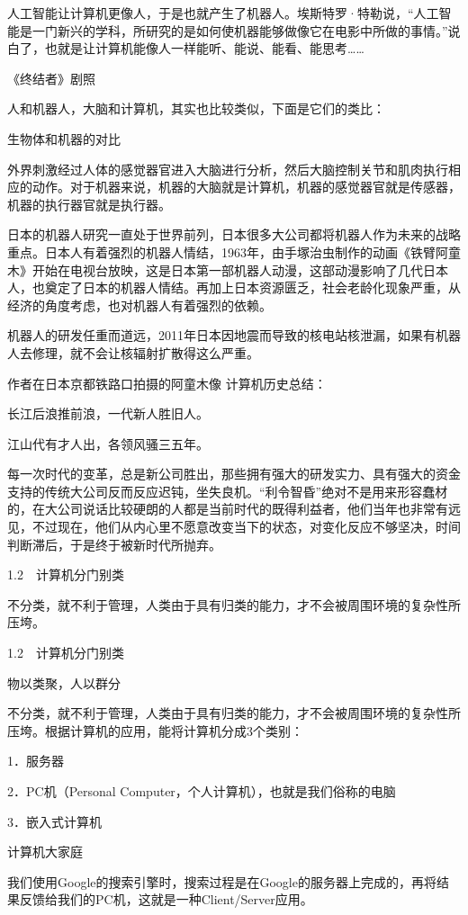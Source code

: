 \documentclass[12pt,UTF8]{ctexbook}
\begin{document}
人工智能让计算机更像人，于是也就产生了机器人。埃斯特罗·特勒说，“人工智能是一门新兴的学科，所研究的是如何使机器能够做像它在电影中所做的事情。”说白了，也就是让计算机能像人一样能听、能说、能看、能思考……

《终结者》剧照

人和机器人，大脑和计算机，其实也比较类似，下面是它们的类比：

生物体和机器的对比

外界刺激经过人体的感觉器官进入大脑进行分析，然后大脑控制关节和肌肉执行相应的动作。对于机器来说，机器的大脑就是计算机，机器的感觉器官就是传感器，机器的执行器官就是执行器。

日本的机器人研究一直处于世界前列，日本很多大公司都将机器人作为未来的战略重点。日本人有着强烈的机器人情结，1963年，由手塚治虫制作的动画《铁臂阿童木》开始在电视台放映，这是日本第一部机器人动漫，这部动漫影响了几代日本人，也奠定了日本的机器人情结。再加上日本资源匮乏，社会老龄化现象严重，从经济的角度考虑，也对机器人有着强烈的依赖。

机器人的研发任重而道远，2011年日本因地震而导致的核电站核泄漏，如果有机器人去修理，就不会让核辐射扩散得这么严重。

作者在日本京都铁路口拍摄的阿童木像
计算机历史总结：

长江后浪推前浪，一代新人胜旧人。

江山代有才人出，各领风骚三五年。

每一次时代的变革，总是新公司胜出，那些拥有强大的研发实力、具有强大的资金支持的传统大公司反而反应迟钝，坐失良机。“利令智昏”绝对不是用来形容蠢材的，在大公司说话比较硬朗的人都是当前时代的既得利益者，他们当年也非常有远见，不过现在，他们从内心里不愿意改变当下的状态，对变化反应不够坚决，时间判断滞后，于是终于被新时代所抛弃。




1.2　计算机分门别类

不分类，就不利于管理，人类由于具有归类的能力，才不会被周围环境的复杂性所压垮。


1.2　计算机分门别类

物以类聚，人以群分

不分类，就不利于管理，人类由于具有归类的能力，才不会被周围环境的复杂性所压垮。根据计算机的应用，能将计算机分成3个类别：

1．服务器

2．PC机（Personal Computer，个人计算机），也就是我们俗称的电脑

3．嵌入式计算机

计算机大家庭

我们使用Google的搜索引擎时，搜索过程是在Google的服务器上完成的，再将结果反馈给我们的PC机，这就是一种Client/Server应用。
\end{document}
